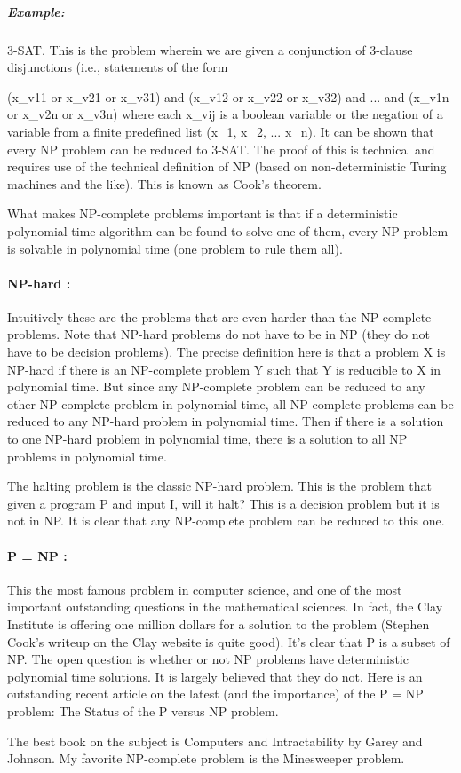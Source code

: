 \documentclass[12pt]{article}
\begin{document}
\subparagraph{\textit{Example:}} 3-SAT. This is the problem wherein we are given a conjunction of 3-clause disjunctions (i.e., statements of the form

(x\_v11 or x\_v21 or x\_v31) and 
(x\_v12 or x\_v22 or x\_v32) and 
...                       and 
(x\_v1n or x\_v2n or x\_v3n)
where each x\_vij is a boolean variable or the negation of a variable from a finite predefined list (x\_1, x\_2, ... x\_n). It can be shown that every NP problem can be reduced to 3-SAT. The proof of this is technical and requires use of the technical definition of NP (based on non-deterministic Turing machines and the like). This is known as Cook's theorem.

What makes NP-complete problems important is that if a deterministic polynomial time algorithm can be found to solve one of them, every NP problem is solvable in polynomial time (one problem to rule them all).

\paragraph{NP-hard :} Intuitively these are the problems that are even harder than the NP-complete problems. Note that NP-hard problems do not have to be in NP (they do not have to be decision problems). The precise definition here is that a problem X is NP-hard if there is an NP-complete problem Y such that Y is reducible to X in polynomial time. But since any NP-complete problem can be reduced to any other NP-complete problem in polynomial time, all NP-complete problems can be reduced to any NP-hard problem in polynomial time. Then if there is a solution to one NP-hard problem in polynomial time, there is a solution to all NP problems in polynomial time.

The halting problem is the classic NP-hard problem. This is the problem that given a program P and input I, will it halt? This is a decision problem but it is not in NP. It is clear that any NP-complete problem can be reduced to this one.

\paragraph{P = NP :} This the most famous problem in computer science, and one of the most important outstanding questions in the mathematical sciences. In fact, the Clay Institute is offering one million dollars for a solution to the problem (Stephen Cook's writeup on the Clay website is quite good). It's clear that P is a subset of NP. The open question is whether or not NP problems have deterministic polynomial time solutions. It is largely believed that they do not. Here is an outstanding recent article on the latest (and the importance) of the P = NP problem: The Status of the P versus NP problem.

The best book on the subject is Computers and Intractability by Garey and Johnson. My favorite NP-complete problem is the Minesweeper problem.


\end{document}
